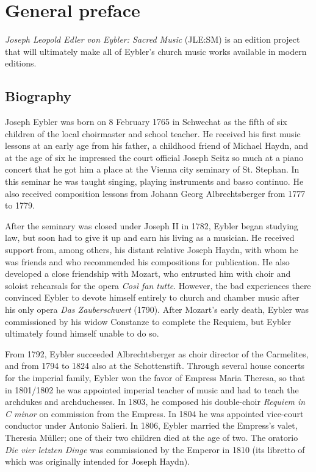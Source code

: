 \documentclass{ees}
\begin{document}

\setcounter{page}{1}

\tableofcontents

\chapter{General preface}

\textit{Joseph Leopold Edler von Eybler: Sacred Music} (JLE:SM) is an edition project that will ultimately make all of Eybler’s church music works available in modern editions.


\section{Biography}

Joseph Eybler was born on 8 February 1765 in Schwechat as the fifth of six children of the local choirmaster and school teacher. He received his first music lessons at an early age from his father, a childhood friend of Michael Haydn, and at the age of six he impressed the court official Joseph Seitz so much at a piano concert that he got him a place at the Vienna city seminary of St. Stephan. In this seminar he was taught singing, playing instruments and basso continuo. He also received composition lessons from Johann Georg Albrechtsberger from 1777 to 1779.

After the seminary was closed under Joseph II in 1782, Eybler began studying law, but soon had to give it up and earn his living as a musician. He received support from, among others, his distant relative Joseph Haydn, with whom he was friends and who recommended his compositions for publication. He also developed a close friendship with Mozart, who entrusted him with choir and soloist rehearsals for the opera \textit{Così fan tutte}. However, the bad experiences there convinced Eybler to devote himself entirely to church and chamber music after his only opera \textit{Das Zauberschwert} (1790). After Mozart's early death, Eybler was commissioned by his widow Constanze to complete the Requiem, but Eybler ultimately found himself unable to do so.

From 1792, Eybler succeeded Albrechtsberger as choir director of the Carmelites, and from 1794 to 1824 also at the Schottenstift. Through several house concerts for the imperial family, Eybler won the favor of Empress Maria Theresa, so that in 1801/1802 he was appointed imperial teacher of music and had to teach the archdukes and archduchesses. In 1803, he composed his double-choir \textit{Requiem in C minor} on commission from the Empress. In 1804 he was appointed vice-court conductor under Antonio Salieri. In 1806, Eybler married the Empress's valet, Theresia Müller; one of their two children died at the age of two. The oratorio \textit{Die vier letzten Dinge} was commissioned by the Emperor in 1810 (its libretto of which was originally intended for Joseph Haydn).
\end{document}
